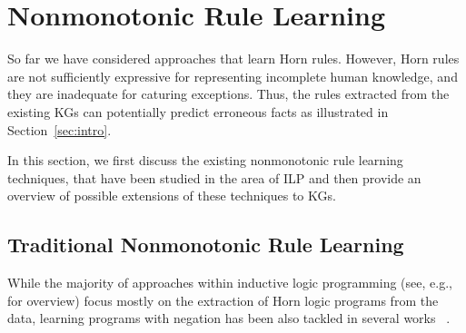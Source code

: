 \section{Nonmonotonic Rule Learning}\label{sec:nmrulelearn}

So far %
we have considered %
approaches that learn Horn rules. However,  Horn rules are not sufficiently expressive for representing incomplete human knowledge, and they are inadequate for caturing
exceptions. Thus, the rules extracted from the existing KGs can potentially %
predict erroneous facts as illustrated in Section~\ref{sec:intro}. %


In this section, we first %
discuss the existing nonmonotonic rule learning techniques, that have been studied in the area of ILP and then provide an overview of possible extensions of these techniques to KGs.



\subsection{Traditional Nonmonotonic Rule Learning}
While the majority of approaches within inductive logic programming (see, e.g., \cite{DBLP:journals/cacm/GulwaniHKMSZ15,DBLP:journals/ml/MuggletonRPBFIS12} for overview) focus mostly on the extraction of Horn logic programs from the data, learning programs with negation has been also tackled in several works %
~\cite{DBLP:conf/ijcai/InoueK97,DBLP:journals/tocl/Sakama05,R08,CorapiRL10,ILASP_system}. %

